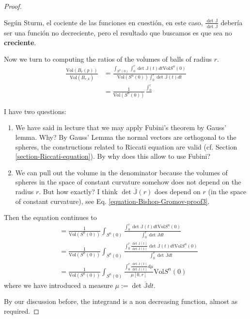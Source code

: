 \begin{proof}
\begin{remark}[Pregunta]
\label{remark-pregunta2}
Según Sturm, el cociente de las funciones en
cuestión, en este caso,
$\frac{\det\mathbb{J}}
{\det\overline{\mathbb{J}}}$
debería ser una función no
decreciente, pero el resultado que buscamos
es que sea no {\bf creciente}.
\end{remark}
\bigskip
Now we turn to computing the ratios of the
volumes of balls of radius $r$.
$$
\begin{aligned}
\frac{\text{Vol}(B_r(p))}{\text{Vol}(B_{r,k})
}&=
\frac{\int_{S^n(0)}\int_0^r\det\mathbb{J}(t)
dt\text{Vol}S^n(0)}
{\text{Vol}(S^n(0))\int_0^r
\det\overline{\mathbb{J}}(t)dt}\\
&=\frac{1}{\text{Vol}(S^n(0))}
\frac{\int_0^r}{}
\end{aligned}
$$
\begin{remark}[Preguntas]
\label{remark-pregunta3}
I have two questions:
\begin{enumerate}
\item We have said in lecture that we may
apply Fubini's theorem by Gauss'
lemma. Why? By Gauss' Lemma the normal
vectors are orthogonal to the spheres,
the constructions related to Riccati equation
are valid (cf. Section
\ref{section-Riccati-equation}). By why does
this allow to use Fubini?
\item We can pull out the volume in the
denominator because the volumes of
spheres in the space of constant curvature
somehow does not depend on the radius
 $r$. But how exactly? I think  $\det
 \overline{\mathbb{J}}(r)$ does depend
on $r$ (in the space of constant curvature),
see Eq.
\ref{equation-Bishop-Gromov-proof3}.
\end{enumerate}
\end{remark}
Then the equation continues to
$$
\begin{aligned}
&=\frac{1}{\text{Vol}(S^n(0))}
\int_{S^n(0)}\frac{\int_0^r \det
\mathbb{J}(t)dt \text{Vol}S^n(0)}
{\int_0^r\det\overline{J}dt}\\
&=\frac{1}{\text{Vol}(S^n(0))}
\int_{S^n(0)}\frac{\int_0^r \frac{\det
\mathbb{J}(t)}
{\det\overline{\mathbb{J}}(t)}
\det\overline{\mathbb{J}}(t)dt
\text{Vol}S^n(0)}
{\int_0^r\det\overline{\mathbb{J}}dt}\\
&=\frac{1}{\text{Vol}(S^n(0))}
\int_{S^n(0)}\frac{\int_0^r \frac{\det
\mathbb{J}(t)}
{\det\overline{\mathbb{J}}(t)}d\mu}{\mu[0,r]}
\text{Vol}S^n(0)
\end{aligned}
$$
where we have introduced a measure
$\mu:=\det \overline{\mathbb{J}}dt$.

By our discussion before, the integrand is a
non decreasing function, almost as
required.


\end{proof}
